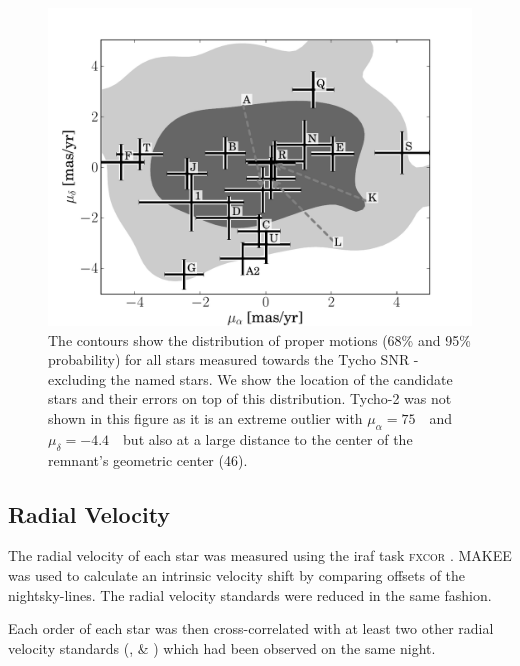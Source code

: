 \begin{figure}[tb] %
   \centering
   \includegraphics[width=\textwidth]{chapter_sn1572_hires/plots/propmot_distr.pdf}
   \caption[Proper motion measurement of stars in SN 1572 using only HST images]{The contours  show the distribution of proper motions (68\% and 95\% probability) for all stars measured towards the Tycho SNR - excluding the named stars.
    We show the location of the candidate stars and their errors on top of this distribution. Tycho-2 was not shown in this figure as it is an extreme outlier with $\mu_\alpha=75$~\masyr\ and $\mu_\delta=-4.4$~\masyr\ but also at a large distance to the center of the remnant's geometric center (46\arcsec).}
   \label{fig:propmot_sn1572_hires}
\end{figure}


\subsection{Radial Velocity}
\label{sec:radvel}

The radial velocity of each star was measured using the \gls{iraf} task \textsc{fxcor} \citep{1979AJ.....84.1511T}. MAKEE was used to calculate an intrinsic velocity shift by comparing offsets of the nightsky-lines. The radial velocity standards were reduced in the same fashion. 
 
Each order of each star was then cross-correlated with at least two other radial velocity standards (,  \& ) which had been observed on the same night.


